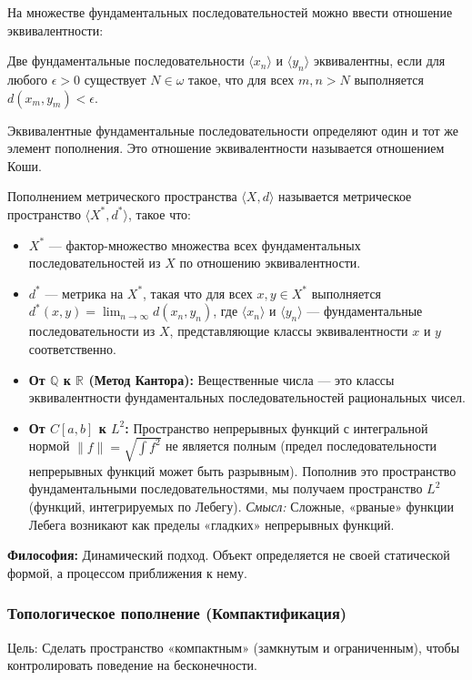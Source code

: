 \documentclass[11pt, a4paper]{extarticle}
\newcommand{\om}{\omega}
\newcommand{\R}{{\mathbb R}}
\newcommand{\Q}{{\mathbb Q}}
\begin{document}
На множестве фундаментальных последовательностей можно ввести отношение эквивалентности:
\begin{definition}
Две фундаментальные последовательности $\langle x_n \rangle$ и $\langle y_n \rangle$ эквивалентны, если для любого $\epsilon > 0$ существует $N\in\om$ такое, что для всех $m, n > N$ выполняется $d(x_m, y_m) < \epsilon$.
\end{definition}
Эквивалентные фундаментальные последовательности определяют один и тот же элемент пополнения. Это отношение эквивалентности называется отношением Коши.

\begin{definition}
Пополнением метрического пространства $\langle X, d \rangle$ называется метрическое пространство $\langle X^*, d^* \rangle$, такое что:
\begin{itemize}
    \item $X^*$ --- фактор-множество множества всех фундаментальных последовательностей из $X$ по отношению эквивалентности.
    \item $d^*$ --- метрика на $X^*$, такая что для всех $x, y \in X^*$ выполняется $d^*(x, y) = \lim_{n\to\infty} d(x_n, y_n)$, где $\langle x_n \rangle$ и $\langle y_n \rangle$ --- фундаментальные последовательности из $X$, представляющие классы эквивалентности $x$ и $y$ соответственно.
\end{itemize}
\end{definition}

\begin{itemize}
    \item \textbf{От $\Q$ к $\R$ (Метод Кантора):} Вещественные числа — это классы эквивалентности фундаментальных последовательностей рациональных чисел.
    \item \textbf{От $C[a,b]$ к $L^2$:} 
    Пространство непрерывных функций с интегральной нормой $\|f\| = \sqrt{\int f^2}$ не является полным (предел последовательности непрерывных функций может быть разрывным). 
    Пополнив это пространство фундаментальными последовательностями, мы получаем пространство $L^2$ (функций, интегрируемых по Лебегу).
    \textit{Смысл:} Сложные, «рваные» функции Лебега возникают как пределы «гладких» непрерывных функций.
\end{itemize}
\textbf{Философия:} Динамический подход. Объект определяется не своей статической формой, а процессом приближения к нему.

\subsubsection{Топологическое пополнение (Компактификация)}
    Цель: Сделать пространство «компактным» (замкнутым и ограниченным), чтобы контролировать поведение на бесконечности.
    
\end{document}
